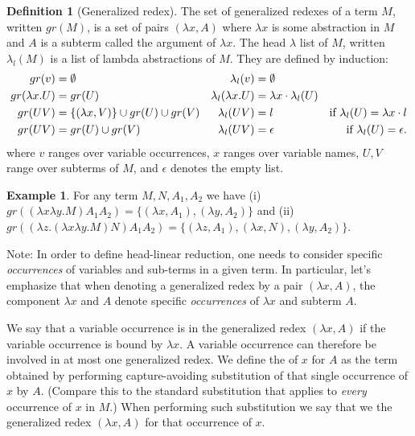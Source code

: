 \documentclass{article}
\theoremstyle{definition}
\newtheorem{definition}{Definition}[section]
\newtheorem{example}{Example}[section]
\begin{document}
\begin{definition}[Generalized redex]
\label{dfn:generalized_redex}
The set of generalized redexes of a term $M$, written $gr(M)$, is a set of pairs $(\lambda x, A)$ where $\lambda x$ is some abstraction in $M$ and $A$ is a subterm called the argument of $\lambda x$. The head $\lambda$ list of $M$, written $\lambda_l(M)$ is a list of lambda abstractions of $M$. They are defined by induction:
\begin{align*}
gr(v) &= \emptyset & \lambda_l(v) &= \emptyset\\
gr(\lambda x. U) &= gr(U) & \lambda_l(\lambda x. U) &= \lambda x \cdot \lambda_l(U) \\
gr(U V) &= \{ (\lambda x, V) \} \cup gr(U) \cup gr(V) &
\lambda_l(U V) &= l & \mbox{if $\lambda_l(U) = \lambda x \cdot l$} \\
gr(U V) &= gr(U) \cup gr(V) & \lambda_l(U V) &= \epsilon & \mbox{if $\lambda_l(U) = \epsilon$.} \\
\end{align*}
where $v$ ranges over variable occurrences, $x$ ranges over variable names, $U, V$ range over subterms of $M$, and $\epsilon$ denotes the empty list.
\end{definition}

\begin{example} For any term $M, N, A_1, A_2$ we have
(i) $gr((\lambda x \lambda y . M) A_1 A_2) = \{ (\lambda x, A_1), (\lambda y, A_2)\}$ and
(ii) $gr((\lambda z . (\lambda x \lambda y . M) N) A_1 A_2) = \{ (\lambda z, A_1), (\lambda x, N), (\lambda y, A_2)\}$.
\end{example}

Note: In order to define head-linear reduction, one needs to consider specific \emph{occurrences} of variables and sub-terms in a given term. In particular, let's emphasize that when denoting a generalized redex by a pair $(\lambda x, A)$, the component $\lambda x$ and $A$ denote specific \emph{occurrences} of $\lambda x$ and subterm $A$.

We say that a variable occurrence is  in the generalized redex $(\lambda x, A)$ if the variable occurrence is bound by $\lambda x$. A variable occurrence can therefore be involved in at most one generalized redex. We define the  of $x$ for $A$ as the term obtained by performing capture-avoiding substitution of that single occurrence of $x$ by $A$. (Compare this to the standard substitution that applies to \emph{every} occurrence of $x$ in $M$.) When performing such substitution we say that we  the generalized redex $(\lambda x, A)$ for that occurrence of $x$.
\end{document}
